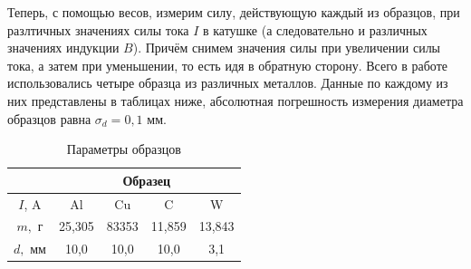 \documentclass[a4paper,12pt]{article}
\begin{document}
Теперь, с помощью весов, измерим силу, действующую каждый из образцов, при разлтичных значениях силы тока $I$ в катушке (а следовательно и различных значениях индукции $B$). Причём снимем значения силы при увеличении силы тока, а затем при уменьшении, то есть идя в обратную сторону. Всего в работе использовались четыре образца из различных металлов. Данные по каждому из них представлены в таблицах ниже, абсолютная погрешность измерения диаметра образцов равна $\sigma_{d} = 0,1$ мм.

\begin{table}[H]\label{tab: Params of obrazec}
    \centering
    \begin{tabular}{|c|cccc|}
        \hline
        {\color[HTML]{000000} } & \multicolumn{4}{c|}{{\color[HTML]{000000} Образец}} \\ \hline
        {\color[HTML]{000000} $I$, A} &
          \multicolumn{1}{c|}{{\color[HTML]{000000} Al}} &
          \multicolumn{1}{c|}{{\color[HTML]{000000} Cu}} &
          \multicolumn{1}{c|}{{\color[HTML]{000000} C}} &
          {\color[HTML]{000000} W} \\ \hline
        {\color[HTML]{000000} $m,$ г} &
          \multicolumn{1}{c|}{{\color[HTML]{000000} 25,305}} &
          \multicolumn{1}{c|}{{\color[HTML]{000000} 83353}} &
          \multicolumn{1}{c|}{{\color[HTML]{000000} 11,859}} &
          {\color[HTML]{000000} 13,843} \\ \hline
        {\color[HTML]{000000} $d,$ мм} &
          \multicolumn{1}{c|}{{\color[HTML]{000000} 10,0}} &
          \multicolumn{1}{c|}{{\color[HTML]{000000} 10,0}} &
          \multicolumn{1}{c|}{{\color[HTML]{000000} 10,0}} &
          {\color[HTML]{000000} 3,1} \\ \hline
    \end{tabular}
    \caption{Параметры образцов}
\end{table}
\end{document}

